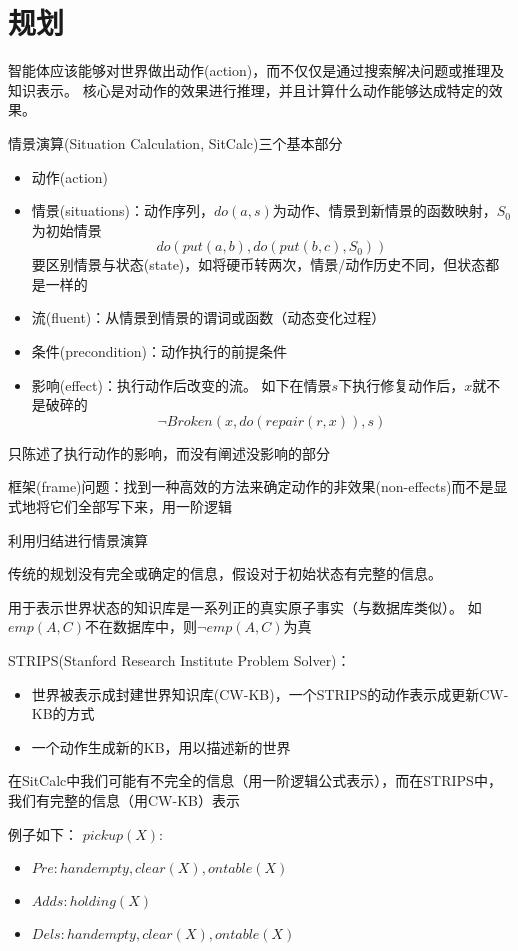 
\section{规划}
智能体应该能够对世界做出动作(action)，而不仅仅是通过搜索解决问题或推理及知识表示。
核心是对动作的效果进行推理，并且计算什么动作能够达成特定的效果。

情景演算(Situation Calculation, SitCalc)三个基本部分
\begin{itemize}
	\item 动作(action)
	\item 情景(situations)：动作序列，$do(a,s)$为动作、情景到新情景的函数映射，$S_0$为初始情景
	\[do(put(a,b),do(put(b,c),S_0))\]
	要区别情景与状态(state)，如将硬币转两次，情景/动作历史不同，但状态都是一样的
	\item 流(fluent)：从情景到情景的谓词或函数（动态变化过程）
	\item 条件(precondition)：动作执行的前提条件
	\item 影响(effect)：执行动作后改变的流。 %
	如下在情景$s$下执行修复动作后，$x$就不是破碎的
	\[\lnot Broken(x,do(repair(r,x)),s)\]
\end{itemize}

只陈述了执行动作的影响，而没有阐述没影响的部分

框架(frame)问题：找到一种高效的方法来确定动作的非效果(non-effects)而不是显式地将它们全部写下来，用一阶逻辑

利用归结进行情景演算

传统的规划没有完全或确定的信息，假设对于初始状态有完整的信息。
\begin{definition}
用于表示世界状态的知识库是一系列正的真实原子事实（与数据库类似）。
如$emp(A,C)$不在数据库中，则$\lnot emp(A,C)$为真
\end{definition}

STRIPS(Stanford Research Institute Problem Solver)：
\begin{itemize}
	\item 世界被表示成封建世界知识库(CW-KB)，一个STRIPS的动作表示成更新CW-KB的方式
	\item 一个动作生成新的KB，用以描述新的世界
\end{itemize}

在SitCalc中我们可能有不完全的信息（用一阶逻辑公式表示），而在STRIPS中，我们有完整的信息（用CW-KB）表示

例子如下：
$pickup(X)$:
\begin{itemize}
\item $Pre: {handempty, clear(X), ontable(X)}$
\item $Adds: {holding(X)}$
\item $Dels: {handempty, clear(X), ontable(X)}$
\end{itemize}
